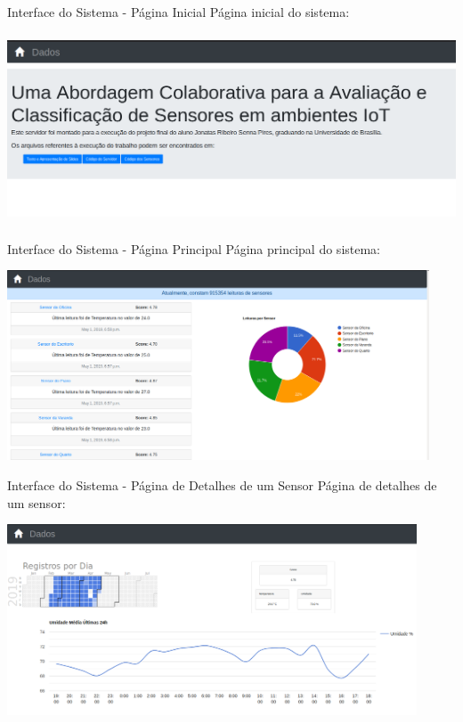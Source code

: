 \documentclass{beamer}
\begin{document}
  \begin{frame}{Interface do Sistema - Página Inicial}
    \quad Página inicial do sistema:
    \begin{center}
    \includegraphics[height=160pt, width=\textwidth]{inicial}
    \end{center}
  \end{frame}
  \begin{frame}{Interface do Sistema - Página Principal}
    \quad Página principal do sistema:
    \begin{center}
    \includegraphics[height=160pt, width=\textwidth]{principal}
    \end{center}
  \end{frame}
  \begin{frame}{Interface do Sistema - Página de Detalhes de um Sensor}
    \quad Página de detalhes de um sensor:
    \begin{center}
    \includegraphics[height=160pt, width=\textwidth]{pSensor}
    \end{center}
  \end{frame}
\end{document}
